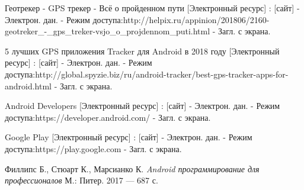 \documentclass[a4paper,12pt]{article}
\begin{document}
\renewcommand{\bibname}{Библиографический список использованной литературы}
\begin{thebibliography}{99}
\vspace{5mm}

Геотрекер - GPS трекер - Всё о пройденном пути [Электронный ресурс] : [сайт] - Электрон. дан. 
- Режим доступа:http://helpix.ru/appinion/201806/2160-geotreker\_-\_gps\_treker-vsjo\_o\_projdennom\_puti.html - Загл. с экрана.

5 лучших GPS приложения Tracker для Android в 2018 году [Электронный ресурс] : [сайт] - Электрон. дан. 
- Режим доступа:http://global.spyzie.biz/ru/android-tracker/best-gps-tracker-apps-for-android.html - Загл. с экрана.

Android Developers [Электронный ресурс] : [сайт] - Электрон. дан. 
- Режим доступа:https://developer.android.com/ - Загл. с экрана.

Google Play [Электронный ресурс] : [сайт] - Электрон. дан. 
- Режим доступа:https://play.google.com - Загл. с экрана.

Филлипс Б., Стюарт К., Марсианко К. {\it Android программирование для профессионалов} М.: Питер. 2017 --- 687 с.

\end{thebibliography}

\end{document}
